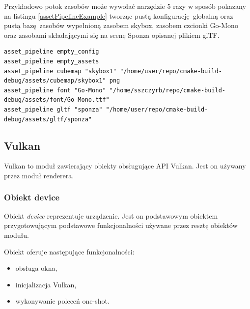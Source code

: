 Przykładowo potok zasobów może wywołać narzędzie 5 razy w sposób pokazany na listingu \ref{assetPipelineExample} tworząc pustą konfigurację globalną oraz pustą bazę zasobów wypełnioną zasobem skybox, zasobem czcionki Go-Mono oraz zasobami składającymi się na scenę Sponza opisanej plikiem glTF.
\lstset{language=verbatim}
\begin{lstlisting}[caption={Komendy wywoływane przez przykładowy potok zasobów},captionpos=b,label={assetPipelineExample}]
asset_pipeline empty_config
asset_pipeline empty_assets
asset_pipeline cubemap "skybox1" "/home/user/repo/cmake-build-debug/assets/cubemap/skybox1" png
asset_pipeline font "Go-Mono" "/home/sszczyrb/repo/cmake-build-debug/assets/font/Go-Mono.ttf"
asset_pipeline gltf "sponza" "/home/user/repo/cmake-build-debug/assets/gltf/sponza"
\end{lstlisting}

\subsection{Vulkan}

Vulkan to moduł zawierający obiekty obsługujące API Vulkan.
Jest on używany przez moduł renderera.

\subsubsection{Obiekt device}
Obiekt \textit{device} reprezentuje urządzenie.
Jest on podstawowym obiektem przygotowującym podstawowe funkcjonalności używane przez resztę obiektów modułu.


Obiekt oferuje następujące funkcjonalności:
\begin{itemize}
	\item obsługa okna,
	\item inicjalizacja Vulkan,
	\item wykonywanie poleceń one-shot.
\end{itemize}

